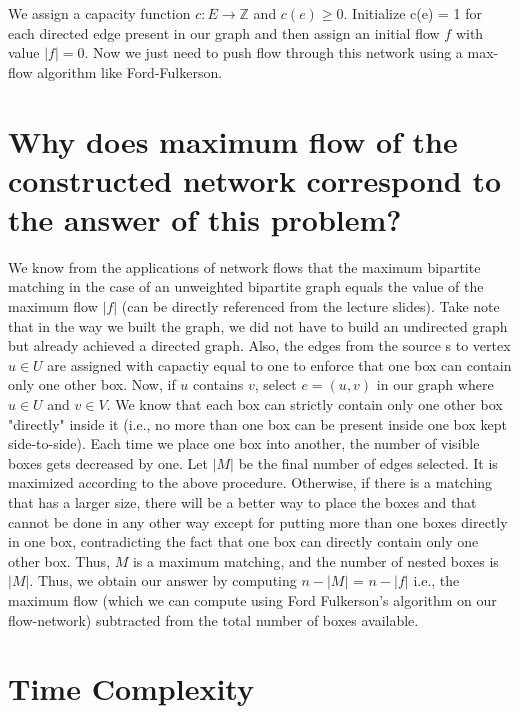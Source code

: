 \documentclass{article}
\begin{document}
\noindent We assign a capacity function $c: E \rightarrow \mathbb{Z}$ and $c(e) \geq 0$. Initialize c(e) = 1 for each directed edge present in our graph and then assign an initial flow $f$ with value $|f| = 0$. Now we just need to push flow through this network using a max-flow algorithm like Ford-Fulkerson.

\section{Why does maximum flow of the constructed network correspond to the answer of this problem?}

We know from the applications of network flows that the maximum bipartite matching in the case of an unweighted bipartite graph equals the value of the maximum flow $|f|$ (can be directly referenced from the lecture slides). Take note that in the way we built the graph, we did not have to build an undirected graph but already achieved a directed graph. Also, the edges from the source s to vertex $u \in U$ are assigned with capactiy equal to one to enforce that one box can contain only one other box. Now, if $u$ contains $v$, select $e = (u, v)$ in our graph where $u \in U$ and $v \in V$. We know that each box can strictly contain only one other box "directly" inside it (i.e., no more than one box can be present inside one box kept side-to-side). Each time we place one box into another, the number of visible boxes gets decreased by one. Let $|M|$ be the final number of edges selected. It is maximized according to the above procedure. Otherwise, if there is a matching that has a larger size, there will be a better way to place the boxes and that cannot be done in any other way except for putting more than one boxes directly in one box, contradicting the fact that one box can directly contain only one other box. Thus, $M$ is a maximum matching, and the number of nested boxes is $|M|$. Thus, we obtain our answer by computing $n - |M|$ = $n - |f|$ i.e., the maximum flow (which we can compute using Ford Fulkerson's algorithm on our flow-network) subtracted from the total number of boxes available.

\section{Time Complexity}
\end{document}

